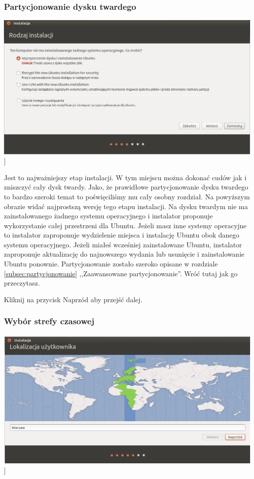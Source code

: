 \subsubsection{Partycjonowanie dysku twardego}
\begin{center}
        \includegraphics[width=\linewidth]{images/instalator_partycjonowanie_proste.png}]
\end{center}

Jest to najważniejszy etap instalacji. W tym miejscu można dokonać cudów jak i zniszczyć cały dysk twardy. Jako, że prawidłowe partycjonowanie dysku twardego to bardzo szeroki temat to poświęciliśmy mu cały osobny rozdział. Na powyższym obrazie widać najprostszą wersję tego etapu instalacji. Na dysku twardym nie ma zainstalowanego żadnego systemu operacyjnego i instalator proponuje wykorzystanie całej przestrzeni dla Ubuntu. Jeżeli masz inne systemy operacyjne to instalator zaproponuje wydzielenie miejsca i instalację Ubuntu obok danego systemu operacyjnego. Jeżeli miałeś wcześniej zainstalowane Ubuntu, instalator zaproponuje aktualizację do najnowszego wydania lub usunięcie i zainstalowanie Ubuntu ponownie.
Partycjonowanie zostało szeroko opisane w rozdziale \ref{subsec:partycjonowanie} ,,Zaawansowane partycjonowanie''. Wróć tutaj jak go przeczytasz.
\begin{flushright}
Kliknij na przycisk \textcolor{ubuntu_orange}{Naprzód} aby przejść dalej.
\end{flushright}
\clearpage
\subsubsection{Wybór strefy czasowej}
\label{instalator_strefa_czasowa}
\begin{center}
        \includegraphics[width=\linewidth]{images/instalator_czas.png}]
\end{center}

